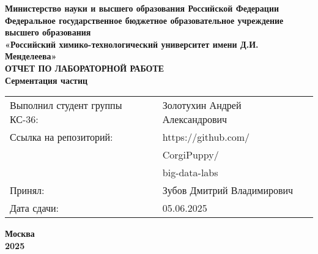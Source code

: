 \documentclass[12pt, a4paper]{report}
\begin{document}
	\begin{titlepage}
		\begin{center}
			\large \textbf{Министерство науки и высшего образования Российской Федерации} \\
			\large \textbf{Федеральное государственное бюджетное образовательное учреждение высшего образования} \\
			\large \textbf{«Российский химико-технологический университет имени Д.И. Менделеева»} \\

			\vspace*{4cm}
			\LARGE \textbf{ОТЧЕТ ПО ЛАБОРАТОРНОЙ РАБОТЕ} \\
			\Large \textbf{Серментация частиц}

			\vspace*{4cm}
			\begin{flushright}
				\Large
				\begin{tabular}{>{\raggedleft\arraybackslash}p{9cm} p{10cm}}
					Выполнил студент группы КС-36: & Золотухин Андрей Александрович \\
					Ссылка на репозиторий: & https://github.com/ \\
					& CorgiPuppy/ \\
					& big-data-labs \\
					Принял: & Зубов Дмитрий Владимирович \\
					Дата сдачи: & 05.06.2025 \\
				\end{tabular}
			\end{flushright}

			\vspace*{5cm}
			\Large \textbf{Москва \\ 2025}
		\end{center}
	\end{titlepage}

	\tableofcontents
	\thispagestyle{empty}
	\newpage

\end{document}
